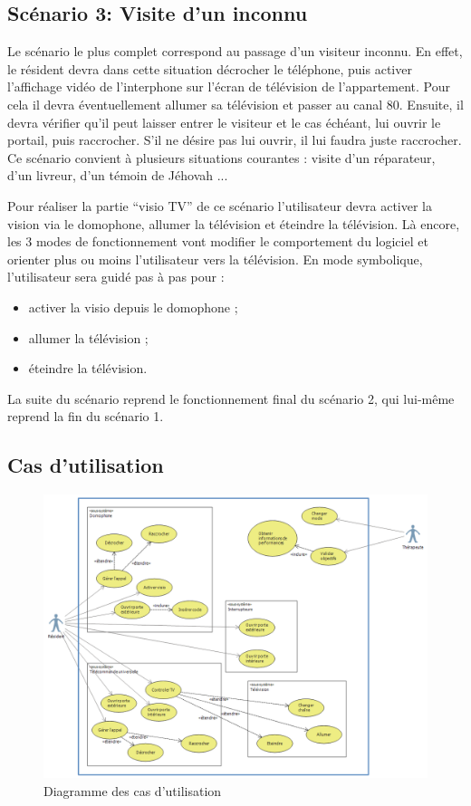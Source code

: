 \subsection{Scénario 3: Visite d'un inconnu}

Le scénario le plus complet correspond au passage d'un visiteur inconnu. En effet, le résident devra dans cette situation décrocher le téléphone, puis activer l'affichage vidéo de l'interphone sur l'écran de télévision de l'appartement. Pour cela il devra éventuellement allumer sa télévision et passer au canal 80. Ensuite, il devra vérifier qu'il peut laisser entrer le visiteur et le cas échéant, lui ouvrir le portail, puis raccrocher. S'il ne désire pas lui ouvrir, il lui faudra juste raccrocher.
Ce scénario convient à plusieurs situations courantes : visite d'un réparateur, d'un livreur, d'un témoin de Jéhovah ...

Pour réaliser la partie \enquote{visio TV} de ce scénario l'utilisateur devra activer la vision via le domophone, allumer la télévision et éteindre la télévision. Là encore, les 3 modes de fonctionnement vont modifier le comportement du logiciel et orienter plus ou moins l'utilisateur vers la télévision. En mode symbolique, l'utilisateur sera guidé pas à pas pour :
\begin{itemize}
	\item activer la visio depuis le domophone ;
	\item allumer la télévision ;
	\item éteindre la télévision.
\end{itemize}
La suite du scénario reprend le fonctionnement final du scénario 2, qui lui-même reprend la fin du scénario 1.

\subsection{Cas d'utilisation}
\begin{figure}[h]
  \caption{Diagramme des cas d'utilisation}
  \includegraphics[width=\textwidth]{1-PreEtude/img/diagramme}
\end{figure}
